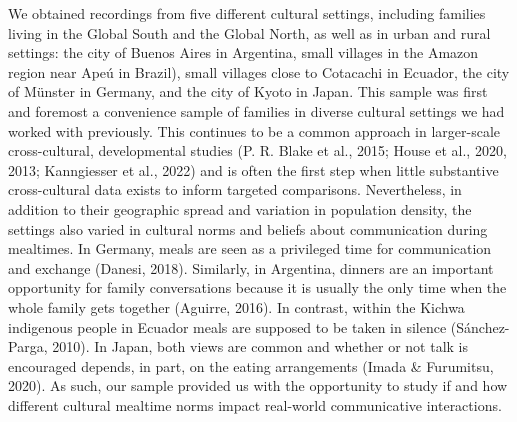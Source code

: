 \documentclass[
  man,floatsintext]{apa6}
\begin{document}
We obtained recordings from five different cultural settings, including families living in the Global South and the Global North, as well as in urban and rural settings: the city of Buenos Aires in Argentina, small villages in the Amazon region near Apeú in Brazil), small villages close to Cotacachi in Ecuador, the city of Münster in Germany, and the city of Kyoto in Japan. This sample was first and foremost a convenience sample of families in diverse cultural settings we had worked with previously. This continues to be a common approach in larger-scale cross-cultural, developmental studies (P. R. Blake et al., 2015; House et al., 2020, 2013; Kanngiesser et al., 2022) and is often the first step when little substantive cross-cultural data exists to inform targeted comparisons. Nevertheless, in addition to their geographic spread and variation in population density, the settings also varied in cultural norms and beliefs about communication during mealtimes. In Germany, meals are seen as a privileged time for communication and exchange (Danesi, 2018). Similarly, in Argentina, dinners are an important opportunity for family conversations because it is usually the only time when the whole family gets together (Aguirre, 2016). In contrast, within the Kichwa indigenous people in Ecuador meals are supposed to be taken in silence (Sánchez-Parga, 2010). In Japan, both views are common and whether or not talk is encouraged depends, in part, on the eating arrangements (Imada \& Furumitsu, 2020). As such, our sample provided us with the opportunity to study if and how different cultural mealtime norms impact real-world communicative interactions.
\end{document}
